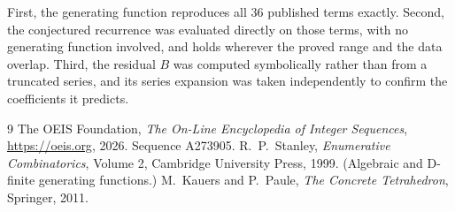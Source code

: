 \documentclass[11pt,a4paper]{article}
\theoremstyle{plain}
\theoremstyle{definition}
\begin{document}
First, the generating function reproduces all $36$ published terms exactly. Second,
the conjectured recurrence was evaluated directly on those terms, with no generating function
involved, and holds wherever the proved range and the data overlap. Third, the residual $B$ was
computed symbolically rather than from a truncated series, and its series expansion was taken
independently to confirm the coefficients it predicts.

\begin{thebibliography}{9}
 The OEIS Foundation, \emph{The On-Line Encyclopedia of Integer Sequences},
\url{https://oeis.org}, 2026. Sequence A273905.
 R.~P.~Stanley, \emph{Enumerative Combinatorics}, Volume 2, Cambridge
University Press, 1999. (Algebraic and D-finite generating functions.)
 M.~Kauers and P.~Paule, \emph{The Concrete Tetrahedron}, Springer, 2011.
\end{thebibliography}
\end{document}
